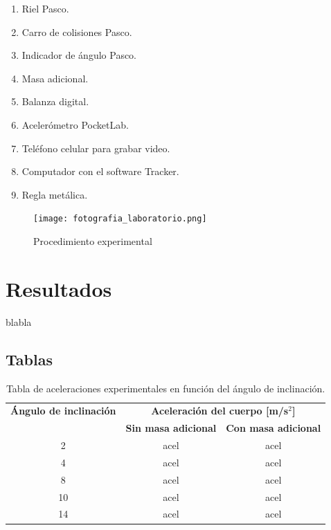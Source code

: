 \documentclass[twocolumn,12pt]{article}
\begin{document}
	\begin{enumerate}
	\item Riel Pasco.
	\item Carro de colisiones Pasco.
	\item Indicador de ángulo Pasco.
	\item Masa adicional.
	\item Balanza digital.
	\item Acelerómetro PocketLab.
	\item Teléfono celular para grabar video.
	\item Computador con el software Tracker. 
	\item Regla metálica.
	\end{enumerate}	
	
	\begin{figure}[h]
	\centering
	\texttt{[image: fotografia\_laboratorio.png]}
	\caption{ Procedimiento experimental}
	\label{Imagen:mi_imagen}
	\end{figure}
	
	\section{Resultados}
	blabla
	
	\subsection{Tablas}

	\onecolumn
	\begin{table}[h!]
	\centering
	\begin{tabular}{|c|c|c|}
	\hline
	\textbf{Ángulo de inclinación} & \multicolumn{2}{c|}{\textbf{Aceleración del cuerpo [m/s\(^2\)]}} \\ \cline{2-3}
	\textbf{} & \textbf{Sin masa adicional} & \textbf{Con masa adicional} \\ \hline
	2\textdegree & acel & acel \\ \hline
	4\textdegree & acel & acel \\ \hline
	8\textdegree & acel & acel \\ \hline
	10\textdegree & acel & acel \\ \hline
	14\textdegree & acel & acel \\ \hline
	\end{tabular}
	\caption{Tabla de aceleraciones experimentales en función del ángulo de inclinación.}
	\label{tabla:aceleraciones}
	\end{table}
	
\end{document}
